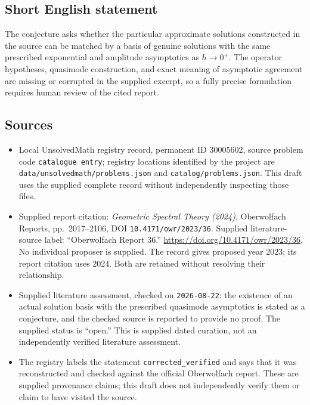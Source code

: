 \documentclass[11pt]{article}
\begin{document}
\subsection{Short English statement}
The conjecture asks whether the particular approximate solutions constructed in the source can be matched by a basis of genuine solutions with the same prescribed exponential and amplitude asymptotics as \(h\to0^+\). The operator hypotheses, quasimode construction, and exact meaning of asymptotic agreement are missing or corrupted in the supplied excerpt, so a fully precise formulation requires human review of the cited report.
\subsection{Sources}
\begin{itemize}
\item Local UnsolvedMath registry record, permanent ID \(30005602\), source problem code \texttt{catalogue entry}; registry locations identified by the project are \texttt{data/unsolvedmath/problems.json} and \texttt{catalog/problems.json}. This draft uses the supplied complete record without independently inspecting those files.
\item Supplied report citation: \emph{Geometric Spectral Theory (2024)}, Oberwolfach Reports, pp.\ 2017--2106, DOI \texttt{10.4171/owr/2023/36}. Supplied literature-source label: ``Oberwolfach Report 36.'' \url{https://doi.org/10.4171/owr/2023/36}. No individual proposer is supplied. The record gives proposed year 2023; its report citation uses 2024. Both are retained without resolving their relationship.
\item Supplied literature assessment, checked on \texttt{2026-08-22}: the existence of an actual solution basis with the prescribed quasimode asymptotics is stated as a conjecture, and the checked source is reported to provide no proof. The supplied status is ``open.'' This is supplied dated curation, not an independently verified literature assessment.
\item The registry labels the statement \texttt{corrected\_verified} and says that it was reconstructed and checked against the official Oberwolfach report. These are supplied provenance claims; this draft does not independently verify them or claim to have visited the source.
\end{itemize}
\end{document}

